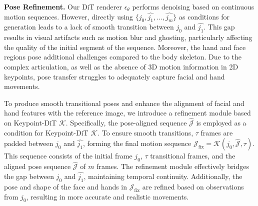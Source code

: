 \noindent\textbf{Pose Refinement.} Our DiT renderer $ \epsilon_\theta $ performs denoising based on continuous motion sequences. However, directly using $\{j_0, \hat{j_1}, \dots, \hat{j_m}\}$ as conditions for generation leads to a lack of smooth transition between $ j_0 $ and $ \hat{j_1} $. This gap results in visual artifacts such as motion blur and ghosting, particularly affecting the quality of the initial segment of the sequence. Moreover, the hand and face regions pose additional challenges compared to the body skeleton. Due to the complex articulation, as well as the absence of 3D motion information in 2D keypoints, pose transfer struggles to adequately capture facial and hand movements. 

To produce smooth transitional poses and enhance the alignment of facial and hand features with the reference image, we introduce a refinement module based on Keypoint-DiT $ \mathcal{K} $. Specifically, the pose-aligned sequence $ \hat{\mathcal{J}} $ is employed as a condition for Keypoint-DiT $ \mathcal{K} $. To ensure smooth transitions, $ \tau $ frames are padded between $ j_0 $ and $ \hat{j_1} $, forming the final motion sequence $ \mathcal{J}_{\text{fix}} = \mathcal{K}(j_0, \hat{\mathcal{J}},\tau) $. This sequence consists of the initial frame $ j_0 $, $ \tau $ transitional frames, and the aligned pose sequence $\hat{\mathcal{J}}$ of $ m $ frames. The refinement module effectively bridges the gap between $ j_0 $ and $ \hat{j_1} $, maintaining temporal continuity. Additionally, the pose and shape of the face and hands in $ \mathcal{J}_{\text{fix}} $ are refined based on observations from $ j_0 $, resulting in more accurate and realistic movements. %

